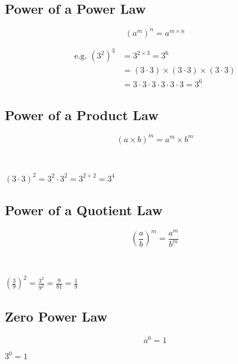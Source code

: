 \documentclass{article}
\begin{document}
\vspace{32pt}
\subsection{Power of a Power Law}
\begin{Large}
$$(a^m)^n=a^{m \times n}$$
\end{Large}
\begin{align*}
\text{e.g. }(3^2)^3&=3^{2 \times 3}=3^6\\
&=(3 \cdot 3) \times (3 \cdot 3) \times (3\cdot 3)\\
&= 3 \cdot 3 \cdot 3 \cdot 3 \cdot 3 \cdot 3=3^6
\end{align*}

\newpage

\subsection{Power of a Product Law}

\begin{Large}
$$(a \times b)^m=a^m \times b^m$$
\end{Large}
\\

\begin{center}
\begin{large}
$(3 \cdot 3)^2=3^2 \cdot 3^2=3^{2+2}=3^4$
\end{large}
\end{center}

\vspace{32pt}
\subsection{Power of a Quotient Law}
\begin{Large}
$$\left(\frac{a}{b}\right)^m=\frac{a^m}{b^m}$$
\end{Large}
\\

\begin{center}
\begin{large}
$\left(\frac{3}{9}\right)^2=\frac{3^2}{9^2}=\frac{9}{81}=\frac{1}{9}$
\end{large}
\end{center}

\newpage

\subsection{Zero Power Law}
\begin{Large}
$$a^0=1$$
\end{Large}
\begin{center}
$3^0=1$
\end{center}
\end{document}
